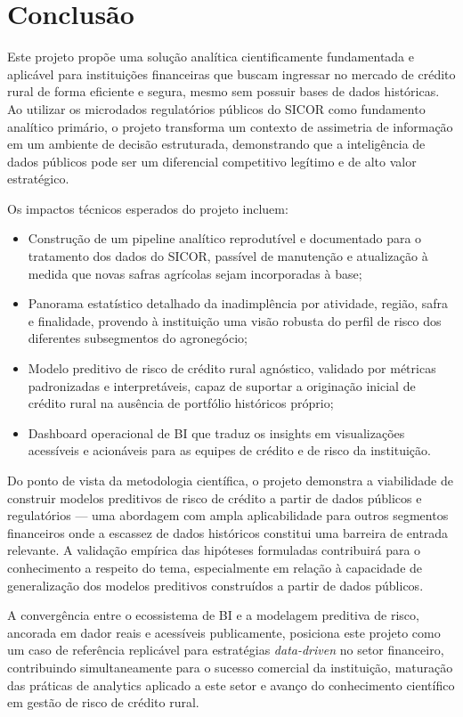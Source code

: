 \chapter{Conclusão} \label{cha:conclusao}

Este projeto propõe uma solução analítica cientificamente fundamentada e aplicável para instituições financeiras que buscam ingressar no mercado de crédito rural de forma eficiente e segura, mesmo sem possuir bases de dados históricas. Ao utilizar os microdados regulatórios públicos do SICOR como fundamento analítico primário, o projeto transforma um contexto de assimetria de informação em um ambiente de decisão estruturada, demonstrando que a inteligência de dados públicos pode ser um diferencial competitivo legítimo e de alto valor estratégico.

Os impactos técnicos esperados do projeto incluem:
\begin{itemize}
    \item[(i)] Construção de um pipeline analítico reprodutível e documentado para o tratamento dos dados do SICOR, passível de manutenção e atualização à medida que novas safras agrícolas sejam incorporadas à base;
    \item[(ii)] Panorama estatístico detalhado da inadimplência por atividade, região, safra e finalidade, provendo à instituição uma visão robusta do perfil de risco dos diferentes subsegmentos do agronegócio;
    \item[(iii)] Modelo preditivo de risco de crédito rural agnóstico, validado por métricas padronizadas e interpretáveis, capaz de suportar a originação inicial de crédito rural na ausência de portfólio históricos próprio;
    \item[(iv)] Dashboard operacional de BI que traduz os insights em visualizações acessíveis e acionáveis para as equipes de crédito e de risco da instituição.
\end{itemize}

Do ponto de vista da metodologia científica, o projeto demonstra a viabilidade de construir modelos preditivos de risco de crédito a partir de dados públicos e regulatórios — uma abordagem com ampla aplicabilidade para outros segmentos financeiros onde a escassez de dados históricos constitui uma barreira de entrada relevante. A validação empírica das hipóteses formuladas contribuirá para o conhecimento a respeito do tema, especialmente em relação à capacidade de generalização dos modelos preditivos construídos a partir de dados públicos.

A convergência entre o ecossistema de BI e a modelagem preditiva de risco, ancorada em dador reais e acessíveis publicamente, posiciona este projeto como um caso de referência replicável para estratégias \textit{data-driven} no setor financeiro, contribuindo simultaneamente para o sucesso comercial da instituição, maturação das práticas de analytics aplicado a este setor e avanço do conhecimento científico em gestão de risco de crédito rural.
